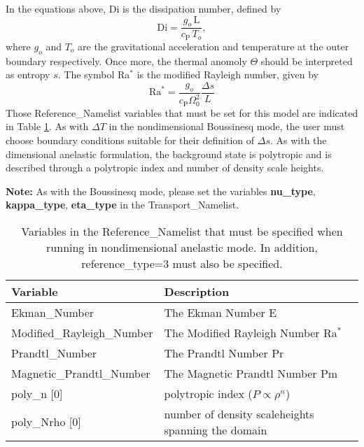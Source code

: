 In the equations above, Di is the dissipation number, defined by
\begin{equation}
\mathrm{Di}= \frac{g_o\,\mathrm{L}}{c_\mathrm{P}\,T_o},
\end{equation}
where $g_o$ and $T_o$ are the gravitational acceleration and temperature at the outer boundary respectively.   Once more, the thermal anomoly $\Theta$ should be interpreted as entropy $s$.   The symbol Ra$^*$ is the modified Rayleigh number, given by
\begin{equation}
\mathrm{Ra}^*=\frac{g_o}{c_\mathrm{P}\Omega_0^2}\frac{\Delta s}{L}   %
\end{equation}
Those Reference\_Namelist variables that must be set for this model are indicated in Table \ref{table:anelastic_nd}.  As with $\Delta T$ in the nondimensional Boussinesq mode, the user must choose boundary conditions suitable for their definition of $\Delta s$.  As with the dimensional anelastic formulation, the background state is polytropic and is described through a polytropic index and number of density scale heights.

\textbf{Note:}  As with the Boussinesq mode, please set the variables \textbf{nu\_type}, \textbf{kappa\_type}, \textbf{eta\_type} in the Transport\_Namelist.

\begin{table}
\centering
\begin{tabular}{| l | l |}
\hline
Variable & Description \\
\hline
Ekman\_Number                  & The Ekman Number E \\
Modified\_Rayleigh\_Number     & The Modified Rayleigh Number Ra$^*$ \\
Prandtl\_Number                & The Prandtl Number Pr \\
Magnetic\_Prandtl\_Number      & The Magnetic Prandtl Number Pm \\
poly\_n [0]                  & polytropic index ($P\propto\rho^n$) \\
poly\_Nrho [0]               & number of density scaleheights spanning the domain \\
\hline
\end{tabular}
\caption{\label{table:anelastic_nd} Variables in the Reference\_Namelist that must be specified when running in nondimensional anelastic mode. In addition, reference\_type=3 must also be specified.}
\end{table}



